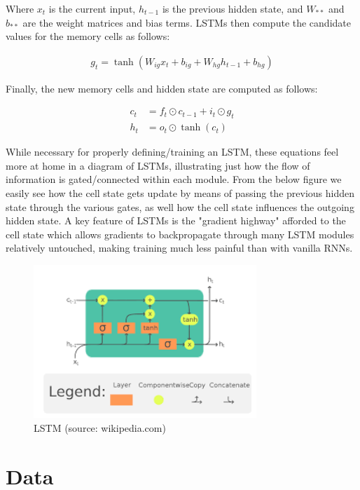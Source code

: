 \documentclass[12pt, twoside]{report}
\begin{document}
Where $x_t$ is the current input, $h_{t-1}$ is the previous hidden state, and $W_{**}$ and $b_{**}$ 
are the weight matrices and bias terms.
LSTMs then compute the candidate values for the memory cells as follows:

\begin{align}
    g_t = \tanh(W_{ig} x_t + b_{ig} + W_{hg} h_{t-1} + b_{hg})
\end{align}

Finally, the new memory cells and hidden state are computed as follows:

\begin{align}
    c_t &= f_t \odot c_{t-1} + i_t \odot g_t \\
    h_t &= o_t \odot \tanh(c_t)
\end{align}

While necessary for properly defining/training an LSTM, these equations feel more at home in a diagram of LSTMs,
illustrating just how the flow of information is gated/connected within each module.
From the below figure we easily see how the cell state gets update by means of passing the
previous hidden state through the various gates, as well how the cell state influences the outgoing
hidden state. A key feature of LSTMs is the "gradient highway" afforded to the cell state which allows
gradients to backpropagate through many LSTM modules relatively untouched, making training much less painful
than with vanilla RNNs.

\begin{figure}[H]
    \centering
    \includegraphics[width=0.75\textwidth]{figures/lstm fig.png}
    \caption*{LSTM (source: wikipedia.com)}
\end{figure}

\section{Data}
\end{document}
